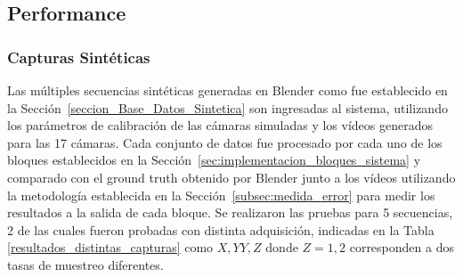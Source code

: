 \subsection{Performance}\label{seccion_performance}

\subsubsection{Capturas Sintéticas}

Las múltiples secuencias sintéticas generadas en Blender como fue establecido en la Sección~\ref{seccion_Base_Datos_Sintetica} son ingresadas al sistema, utilizando los parámetros de calibración de las cámaras simuladas y los vídeos generados para las 17 cámaras. Cada conjunto de datos fue procesado por cada uno de los bloques establecidos en la Sección~\ref{sec:implementacion_bloques_sistema} y comparado con el ground truth obtenido por Blender junto a los vídeos utilizando la metodología establecida en la Sección~\ref{subsec:medida_error} para medir los resultados a la salida de cada bloque. Se realizaron las pruebas para 5 secuencias, 2 de las cuales fueron probadas con distinta adquisición, indicadas en la Tabla \ref{resultados_distintas_capturas} como $X,YY,Z$ donde $Z=1,2$ corresponden a dos tasas de muestreo diferentes.

